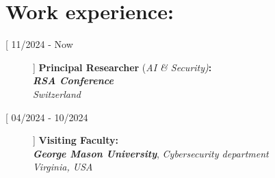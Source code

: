 \documentclass[margin, 10pt]{article} %
\begin{document}
\noindent\makebox[\linewidth]{\rule{.8\paperwidth}{0.3pt}}


\section*{Work experience:} 

\begin{description}
	
\item[[ {11/2024 - Now}]] \textbf{Principal Researcher} (\textit{AI \& Security)}\textbf{:}\\
 \textbf{\textit{RSA Conference}}\\
 \textit{Switzerland}

\item[[ {04/2024 - 10/2024}]] \textbf{Visiting Faculty:}\\
 \textbf{\textit{George Mason University}},  \textit{Cybersecurity department}\\
 \textit{Virginia, USA}


\end{description}
\end{document}
